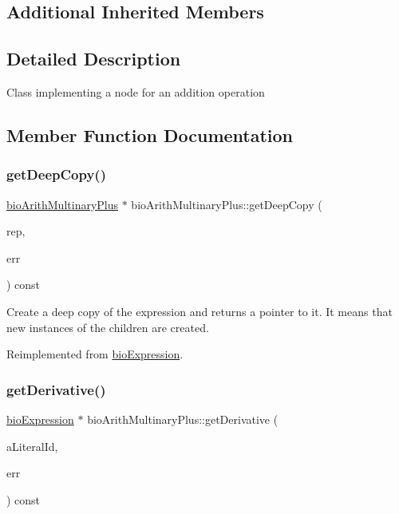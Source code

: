 \subsection*{Additional Inherited Members}


\subsection{Detailed Description}
Class implementing a node for an addition operation 

\subsection{Member Function Documentation}
\mbox{\label{classbio_arith_multinary_plus_acdd35f59addcdc2e2947fe0d3f594e1f}} 
\subsubsection{\texorpdfstring{get\+Deep\+Copy()}{getDeepCopy()}}
{\footnotesize\ttfamily \hyperlink{classbio_arith_multinary_plus}{bio\+Arith\+Multinary\+Plus} $\ast$ bio\+Arith\+Multinary\+Plus\+::get\+Deep\+Copy (\begin{DoxyParamCaption}\item[{\hyperlink{classbio_expression_repository}{bio\+Expression\+Repository} $\ast$}]{rep,  }\item[{pat\+Error $\ast$\&}]{err }\end{DoxyParamCaption}) const\hspace{0.3cm}{\ttfamily [virtual]}}

Create a deep copy of the expression and returns a pointer to it. It means that new instances of the children are created. 

Reimplemented from \hyperlink{classbio_expression_a4ee1b8add634078a02eaae26cd40dcc8}{bio\+Expression}.

\mbox{\label{classbio_arith_multinary_plus_a6677355df11e314a1729fb7bd79d9188}} 
\subsubsection{\texorpdfstring{get\+Derivative()}{getDerivative()}}
{\footnotesize\ttfamily \hyperlink{classbio_expression}{bio\+Expression} $\ast$ bio\+Arith\+Multinary\+Plus\+::get\+Derivative (\begin{DoxyParamCaption}\item[{pat\+U\+Long}]{a\+Literal\+Id,  }\item[{pat\+Error $\ast$\&}]{err }\end{DoxyParamCaption}) const\hspace{0.3cm}{\ttfamily [virtual]}}

